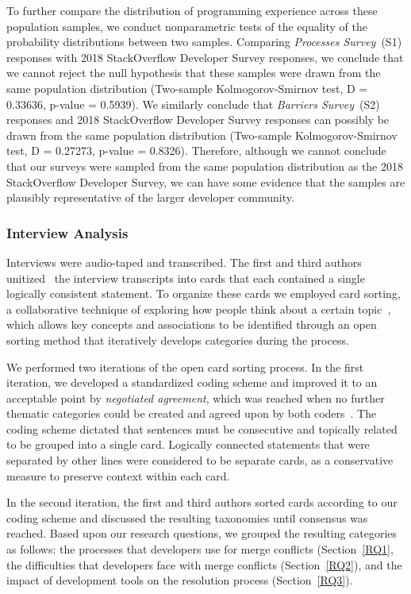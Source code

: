 To further compare the distribution of programming experience across these population samples, we conduct nonparametric tests of the equality of the probability distributions between two samples.
Comparing \textit{Processes Survey}~(S1) responses with 2018 StackOverflow Developer Survey responses, we conclude that we cannot reject the null hypothesis that these samples were drawn from the same population distribution (Two-sample Kolmogorov-Smirnov test, D = 0.33636, p-value = 0.5939).
We similarly conclude that \textit{Barriers Survey}~(S2) responses and 2018 StackOverflow Developer Survey responses can possibly be drawn from the same population distribution (Two-sample Kolmogorov-Smirnov test, D = 0.27273, p-value = 0.8326).
Therefore, although we cannot conclude that our surveys were sampled from the same population distribution as the 2018 StackOverflow Developer Survey, we can have some evidence that the samples are plausibly representative of the larger developer community. 

\subsubsection{Interview Analysis}

Interviews were audio-taped and transcribed. 
The first and third authors unitized~\cite{unitization} the interview transcripts into cards that each contained a single logically consistent statement. 
To organize these cards we employed card sorting, a collaborative technique of exploring how people think about a certain topic~\cite{spencer2009card}\cite{card_sort}, which allows key concepts and associations to be identified through an open sorting method that iteratively develops categories during the process.

We performed two iterations of the open card sorting process.
In the first iteration, we developed a standardized coding scheme and improved it to an acceptable point by \textit{negotiated agreement}, which was reached when no further thematic categories could be created and agreed upon by both coders~\cite{garrison2006revisiting}\cite{ritchie2013qualitative}.
The coding scheme dictated that sentences must be consecutive and topically related to be grouped into a single card.
Logically connected statements that were separated by other lines were considered to be separate cards, as a conservative measure to preserve context within each card.

In the second iteration, the first and third authors sorted cards according to our coding scheme and discussed the resulting taxonomies until consensus was reached.
Based upon our research questions, we grouped the resulting categories as follows: the processes that developers use for merge conflicts (Section~\ref{RQ1}, the difficulties that developers face with merge conflicts (Section~\ref{RQ2}), and the impact of development tools on the resolution process (Section~\ref{RQ3}).

